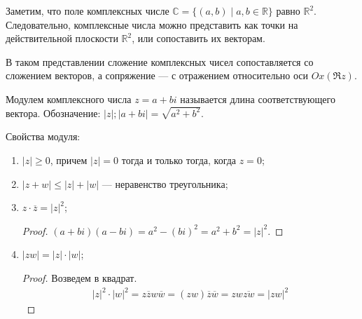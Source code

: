 Заметим, что поле комплексных числе $\mathbb{C} = \{(a, b) \mid a, b \in \mathbb{R}\}$ равно $\mathbb{R}^2$. Следовательно, комплексные числа можно представить как точки на действительной плоскости $\mathbb{R}^2$, или сопоставить их векторам.

\begin{center}
\end{center}

В таком представлении сложение комплексных чисел сопоставляется со сложением векторов, а сопряжение — с отражением относительно оси $Ox (\Re z)$.

\begin{Def}
Модулем комплексного числа $z = a + bi$ называется длина соответствующего вектора. Обозначение: $|z|; |a+bi| = \sqrt{a^2 + b^2}$.
\end{Def}

Свойства модуля:
\begin{enumerate}
\item $|z| \geqslant 0$, причем $|z| = 0$ тогда и только тогда, когда $z = 0$;
\item $|z + w| \leqslant |z| + |w|$ — неравенство треугольника;
\item $z\cdot\overline{z} = |z|^2$;
\begin{proof}
$(a + bi)(a - bi) = a^2 - (bi)^2 = a^2 + b^2 = |z|^2$.
\end{proof}
\item $|zw| = |z| \cdot |w|$;
\begin{proof}
Возведем в квадрат.
\begin{gather*}
|z|^2 \cdot |w|^2 = z \overline{z} w \overline{w} = (zw)\overline{z}\overline{w} = zw\overline{zw} = |zw|^2
\end{gather*}
\end{proof}
\end{enumerate}

